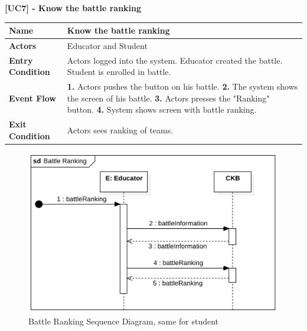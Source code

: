 \raggedright
\textbf{[UC7] - Know the battle ranking}
\begin{table}[h]
\begin{tabular}{|l|p{12cm}|} \hline 

\rule[-3mm]{0mm}{1cm}
\textbf{Name} & Know the battle ranking \\ \hline 

\rule[-3mm]{0mm}{1cm}
\textbf{Actors} & Educator and Student \\ \hline 

\rule[-3mm]{0mm}{1cm}
\textbf{Entry Condition} & Actors logged into the system.
\newline
Educator created the battle.
\newline
Student is enrolled in battle.
\vspace{2pt}
\\ \hline 

\rule[-3mm]{0mm}{1cm}
\textbf{Event Flow} & 
\textbf{1.} Actors pushes the button on his battle.
\vspace{4pt}
\newline
\textbf{2.} The system shows the screen of his battle.
\vspace{4pt}
\newline
\textbf{3.} Actors presses the "Ranking" button.
\vspace{4pt}
\newline
\textbf{4.} System shows screen with battle ranking.

\\ \hline 

\rule[-3mm]{0mm}{1cm}
\textbf{Exit Condition} & Actors sees ranking of teams. \\ \hline

\end{tabular}
\end{table}

\begin{figure}[h]
    \centering
    \includegraphics[scale=0.5]{images/SD/RankingBattleSD.png} 
    \caption{Battle Ranking Sequence Diagram, same for student}
    \label{fig_RankingBattleSD}
\end{figure}

